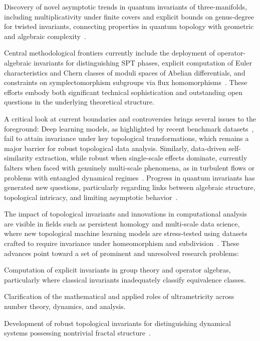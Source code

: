 \documentclass[sigconf]{acmart}
\begin{document}
Discovery of novel asymptotic trends in quantum invariants of three-manifolds, including multiplicativity under finite covers and explicit bounds on genus-degree for twisted invariants, connecting properties in quantum topology with geometric and algebraic complexity~\cite{ref87, ref89, ref90}.

Central methodological frontiers currently include the deployment of operator-algebraic invariants for distinguishing SPT phases, explicit computation of Euler characteristics and Chern classes of moduli spaces of Abelian differentials, and constraints on symplectomorphism subgroups via flux homomorphisms~\cite{ref86, ref87}. These efforts embody both significant technical sophistication and outstanding open questions in the underlying theoretical structure.

A critical look at current boundaries and controversies brings several issues to the foreground: Deep learning models, as highlighted by recent benchmark datasets~\cite{ref26}, fail to attain invariance under key topological transformations, which remains a major barrier for robust topological data analysis. Similarly, data-driven self-similarity extraction, while robust when single-scale effects dominate, currently falters when faced with genuinely multi-scale phenomena, as in turbulent flows or problems with entangled dynamical regimes~\cite{ref65, ref30}. Progress in quantum invariants has generated new questions, particularly regarding links between algebraic structure, topological intricacy, and limiting asymptotic behavior~\cite{ref87, ref89, ref90}.

The impact of topological invariants and innovations in computational analysis are visible in fields such as persistent homology and multi-scale data science, where new topological machine learning models are stress-tested using datasets crafted to require invariance under homeomorphism and subdivision~\cite{ref36}. These advances point toward a set of prominent and unresolved research problems:

Computation of explicit invariants in group theory and operator algebras, particularly where classical invariants inadequately classify equivalence classes.

Clarification of the mathematical and applied roles of ultrametricity across number theory, dynamics, and analysis.

Development of robust topological invariants for distinguishing dynamical systems possessing nontrivial fractal structure~\cite{ref86, ref87, ref89, ref90}.
\end{document}
